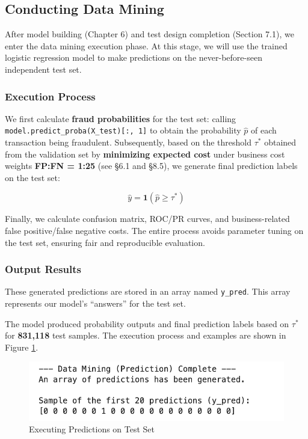 \documentclass[sigplan,screen]{acmart}
\begin{document}
\subsection{Conducting Data Mining}

After model building (Chapter 6) and test design completion (Section 7.1), we enter the data mining execution phase. At this stage, we will use the trained logistic regression model to make predictions on the never-before-seen independent test set.

\subsubsection{Execution Process}

We first calculate \textbf{fraud probabilities} for the test set: calling \texttt{model.predict\_proba(X\_test)[:, 1]} to obtain the probability $\hat{p}$ of each transaction being fraudulent. Subsequently, based on the threshold \textbf{$\tau^*$} obtained from the validation set by \textbf{minimizing expected cost} under business cost weights \textbf{FP:FN = 1:25} (see \S6.1 and \S8.5), we generate final prediction labels on the test set:

$$\hat{y} = \mathbf{1}(\hat{p} \geq \tau^*)$$

Finally, we calculate confusion matrix, ROC/PR curves, and business-related false positive/false negative costs. The entire process avoids parameter tuning on the test set, ensuring fair and reproducible evaluation.

\subsubsection{Output Results}

These generated predictions are stored in an array named \texttt{y\_pred}. This array represents our model's ``answers'' for the test set.

The model produced probability outputs and final prediction labels based on \textbf{$\tau^*$} for \textbf{831,118} test samples. The execution process and examples are shown in Figure \ref{fig:test_predictions}.

\begin{figure}[h!]
    \centering
    \includegraphics[width=0.9\columnwidth]{7.2.png}
    \caption{Executing Predictions on Test Set}
    \label{fig:test_predictions}
\end{figure}
\end{document}
